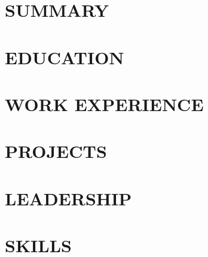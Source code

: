 \documentclass[letterpaper,11pt]{article}
\begin{document}

\vspace{\resumeHeaderGap}

\section{SUMMARY}
\resumeEntryListStart
  
\resumeEntryListEnd

\section{EDUCATION}
\resumeEntryListStart
  
  
\resumeEntryListEnd

\section{WORK EXPERIENCE}
\resumeEntryListStart
  
  
\resumeEntryListEnd

\section{PROJECTS}
\resumeEntryListStart
  
  
\resumeEntryListEnd

\section{LEADERSHIP}
\resumeEntryListStart
  
\resumeEntryListEnd


\section{SKILLS}
\begin{itemize}[leftmargin=0in, label={}]
  
\end{itemize}
\end{document}
